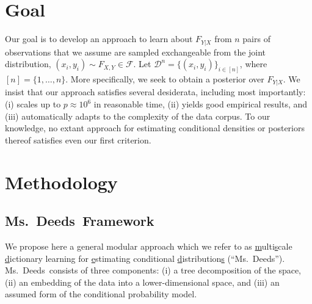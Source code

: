 \documentclass{article} %
\providecommand{\mc}[1]{\mathcal{#1}}
\newcommand{\msd}{Ms.~Deeds}
\begin{document}
\section{Goal} \label{sec:goal}

Our goal is to develop an approach to learn about $F_{Y|X}$ from $n$ pairs of observations that we assume are sampled exchangeable from the joint distribution, $(x_i,y_i) \sim F_{X,Y} \in \mc{F}$. Let $\mc{D}^n=\{(x_i,y_i)\}_{i \in [n]}$, where $[n]=\{1,\ldots, n\}$.  More specifically, we seek to obtain a posterior over $F_{Y|X}$.  We insist that our approach satisfies several desiderata, including most importantly: (i) scales up to $p \approx 10^6$ in reasonable time,  (ii) yields good empirical results, and (iii) automatically adapts to the complexity of the data corpus.  To our knowledge, no extant approach for estimating conditional densities or posteriors thereof satisfies even our first criterion. 


\section{Methodology} \label{sec:method}

\subsection{\msd~Framework} \label{sub:method}

We propose here a general modular approach which we refer to as \uline{m}ulti\uline{s}cale \uline{d}ictionary learning for \uline{e}stimating conditional \uline{d}istribution\uline{s} (``\msd''). \msd~consists of three components: (i) a tree decomposition of the space, (ii) an embedding of the data into a lower-dimensional space,  and (iii) an assumed form of the conditional probability model. 
\end{document}
